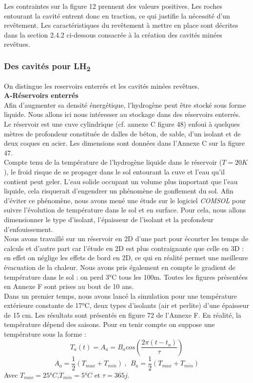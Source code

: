 \documentclass[11pt,french,a4paper]{article}
\begin{document}
Les contraintes sur la figure 12 prennent des valeurs positives. Les roches entourant la cavité entrent donc en traction, ce qui justifie la nécessité d’un revêtement. Les caractéristiques du revêtement à mettre en place sont décrites dans la section 2.4.2 ci-dessous consacrée à la création des cavités minées revêtues.



\subsubsection{Des cavités pour LH\textsubscript{2}}
On distingue les reservoirs enterrés et les cavités minées revêtues.\\

\textbf{A-Réservoirs enterrés}\\
Afin d’augmenter sa densité énergétique, l'hydrogène peut être stocké sous forme liquide. Nous allons ici nous intéresser au stockage dans des réservoirs enterrés. Le réservoir est une cuve cylindrique (cf. annexe C figure 48) enfoui à quelques mètres de profondeur constituée de dalles de béton, de sable, d’un isolant et de deux coques en acier. Les dimensions sont données dans l'Annexe C sur la figure 47.\\

Compte tenu de la température de l’hydrogène liquide dans le réservoir ($T = 20K$), le froid risque de se propager dans le sol entourant la cuve et l’eau qu’il contient peut geler. L’eau solide occupant un volume plus important que l’eau liquide, cela risquerait d’engendrer un phénomène de gonflement du sol. Afin d’éviter ce phénomène, nous avons mené une étude sur le logiciel \emph{COMSOL} pour suivre l’évolution de température dans le sol et en surface. Pour cela, nous allons dimensionner le type d'isolant, l'épaisseur de l'isolant et la profondeur d'enfouissement.\\

Nous avons travaillé sur un réservoir en 2D d’une part pour écourter les temps de calculs et d’autre part car l’étude en 2D est plus contraignante que celle en 3D : en effet on néglige les effets de bord en 2D, ce qui en réalité permet une meilleure évacuation de la chaleur. Nous avons pris également en compte le gradient de température dans le sol : on perd 3°C tous les 100m. Toutes les figures présentées en Annexe F sont prises au bout de 10 ans.  \\


Dans un premier temps, nous avons lancé la simulation pour une température extérieure constante de 17°C, deux types d’isolants (air et perlite) d’une épaisseur de 15 cm.  
Les résultats sont présentés en figure 72 de l'Annexe F. En réalité, la température dépend des saisons. Pour en tenir compte on suppose une température sous la forme : $$T_a(t) = A_a=B_a cos(\frac{2\pi(t-t_a)}{\tau})$$ $$A_a=\frac{1}{2}(T_{max} + T_{min}) \ , \ \ B_a =\frac{1}{2} ( T_{max} + T_{min})$$
Avec $T_{max}=25°C$,$T_{min}=5°C$ et $\tau=365 j$.
\end{document}
